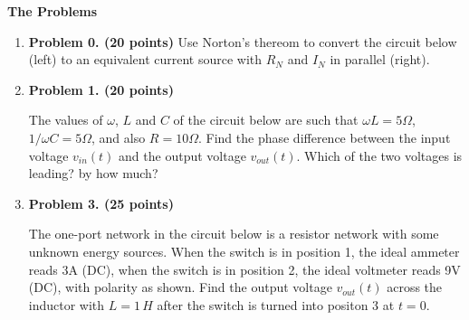 {\bf The Problems}
\begin{enumerate}

\item {\bf Problem 0. (20 points)} 
Use Norton's thereom to convert the circuit below (left) to an equivalent 
current source with $R_N$ and $I_N$ in parallel (right).



\item {\bf Problem 1. (20 points)} 

The values of $\omega$, $L$ and $C$ of the circuit below are such that 
$\omega L=5\Omega$, $1/\omega C=5\Omega$, and also $R=10\Omega$. Find the 
phase difference between the input voltage $v_{in}(t)$ and the output 
voltage $v_{out}(t)$. Which of the two voltages is leading? by how much?



\item {\bf Problem 3. (25 points)} 

The one-port network in the circuit below is a resistor network with some
unknown energy sources. When the switch is in position 1, the ideal ammeter 
reads 3A (DC), when the switch is in position 2, the ideal voltmeter reads 9V
(DC), with polarity as shown. Find the output voltage $v_{out}(t)$ across the
inductor with $L=1\,H$ after the switch is turned into positon 3 at $t=0$.




\end{enumerate}
